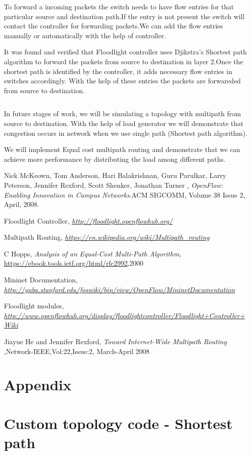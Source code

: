 \documentclass[12pt,a4paper]{article}
\begin{document}
To forward a incoming packets the switch needs to have flow entries for that particular source and destination path.If the entry is not present the switch will contact the controller for forwarding packets.We can add the flow entries manually or automatically with the help of controller.


It was found and verified that Floodlight controller uses Djikstra's Shortest path algorithm to forward the packets from source to destination in layer 2.Once the shortest path is identified by the controller, it adds necessary flow entries in switches accordingly. With the help of these entries the packets are forwareded from source to destination.

\begin{verbatim}

\end{verbatim}
In future stages of work, we will be simulating a topology with multipath from source to destination. With the help of load generator we will demonstrate that congestion occurs in network when we use single path (Shortest path algorithm).

We will implement Equal cost multipath routing and demonstrate that we can achieve more performance by distributing the load among different paths.

\newpage
\begin{thebibliography}{9}

  Nick McKeown, Tom Anderson, Hari Balakrishnan, Guru Parulkar, Larry Peterson, Jennifer
Rexford, Scott Shenker, Jonathan Turner
,
  \emph{OpenFlow: Enabling Innovation in Campus Networks}.ACM SIGCOMM, Volume 38 Issue 2,
  April,
  2008.
  
Floodlight Controller,
\emph{\url {http://floodlight.openflowhub.org/}}

Multipath Routing,
\emph{\url{https://en.wikipedia.org/wiki/Multipath_routing
}}

C Hopps,
\emph{Analysis of an Equal-Cost Multi-Path Algorithm},
\url{https://ebook.tools.ietf.org/html/rfc2992},2000

Mininet Documentation,
\emph{\url{http://yuba.stanford.edu/foswiki/bin/view/OpenFlow/MininetDocumentation}}

Floodlight modules,
\emph{\url{http://www.openflowhub.org/display/floodlightcontroller/Floodlight+Controller+Wiki}}

Jiayue He and Jennifer Rexford,
\emph{Toward Internet-Wide Multipath Routing
},Network-IEEE,Vol:22,Issue:2, March-April 2008


\end{thebibliography}
\newpage

\section*{Appendix}
\appendix
\section{Custom topology code - Shortest path}

\end{document}
